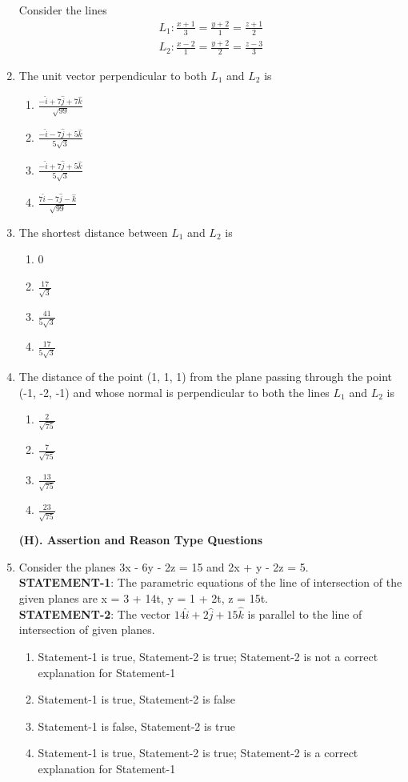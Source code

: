 \begin{enumerate}[label=\arabic*.,ref=\thesubsection.\theenumi]
Consider the lines
\begin{align*}
L_1: \frac{x + 1}{3} = \frac{y + 2}{1} = \frac{z + 1}{2}
\end{align*}
\begin{align*}
L_2: \frac{x - 2}{1}=\frac{y + 2}{2} = \frac{z - 3}{3}
\end{align*}
\item The unit vector perpendicular to both $L_1$ and $L_2$ is
\begin{enumerate}
\item $\frac{-\hat{i} + 7\hat{j} + 7\hat{k}}{\sqrt{99}}$
\item $\frac{-\hat{i} - 7\hat{j} + 5\hat{k}}{5\sqrt{3}}$
\item $\frac{-\hat{i} + 7\hat{j} + 5\hat{k}}{5\sqrt{3}}$
\item $\frac{7\hat{i} - 7\hat{j} - \hat{k}}{\sqrt{99}}$
\end{enumerate}

\item The shortest distance between $L_1$ and $L_2$ is
\begin{enumerate}
\item 0
\item $\frac{17}{\sqrt{3}}$
\item $\frac{41}{5\sqrt{3}}$
\item $\frac{17}{5\sqrt{3}}$
\end{enumerate}

\item The distance of the point (1, 1, 1) from the plane passing through the point (-1, -2, -1) and whose normal is perpendicular to both the lines $L_1$ and $L_2$ is
\begin{enumerate}
\item $\frac{2}{\sqrt{75}}$
\item $\frac{7}{\sqrt{75}}$
\item $\frac{13}{\sqrt{75}}$
\item $\frac{23}{\sqrt{75}}$
\end{enumerate}

\textbf{(H). Assertion and Reason Type Questions}

\item Consider the planes 3x - 6y - 2z = 15 and 2x + y - 2z = 5.\\
\textbf{STATEMENT-1}: The parametric equations of the line of intersection of the given planes are x = 3 + 14t, y = 1 + 2t, z = 15t.\\
\textbf{STATEMENT-2}: The vector $14\hat{i} + 2\hat{j} + 15\hat{k}$ is parallel to the line of intersection of given planes.
\begin{enumerate}
\item Statement-1 is true, Statement-2 is true; Statement-2 is not a correct explanation for Statement-1
\item Statement-1 is true, Statement-2 is false
\item Statement-1 is false, Statement-2 is true
\item Statement-1 is true, Statement-2 is true; Statement-2 is a correct explanation for Statement-1
\end{enumerate}


\end{enumerate}

